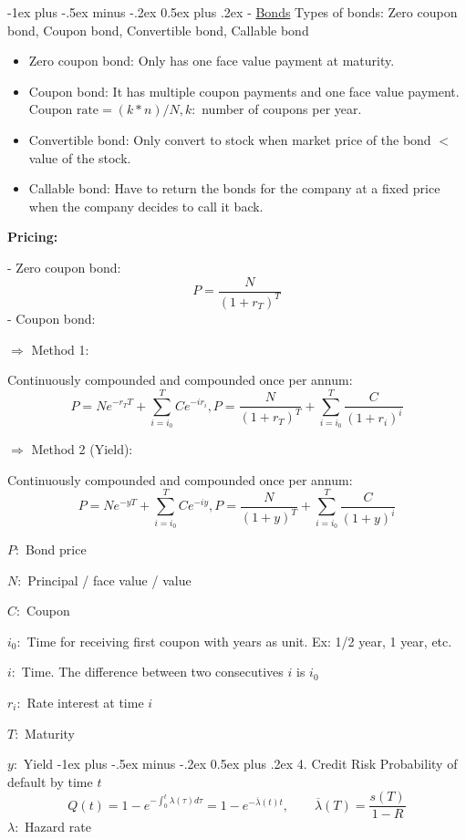 \documentclass[10pt,landscape]{article}
\makeatletter
\renewcommand{\section}{\@startsection{section}{1}{0mm}%
                                {-1ex plus -.5ex minus -.2ex}%
                                {0.5ex plus .2ex}%
                                {\normalfont\large\bfseries}}
\renewcommand{\subsection}{\@startsection{subsection}{2}{0mm}%
                                {-1ex plus -.5ex minus -.2ex}%
                                {0.5ex plus .2ex}%
                                {\normalfont\normalsize\bfseries}}
\makeatother
\begin{document}
\begin{multicols}{3}
    \subsection{- \underline{Bonds}}
    Types of bonds:
    Zero coupon bond, Coupon bond, Convertible bond, Callable bond
    \begin{itemize}[label={--},leftmargin=4mm]
        \vspace{-1mm}
        \itemsep -.4mm
        \item Zero coupon bond: Only has one face value payment at maturity.
        \item Coupon bond: It has multiple coupon payments and one face value payment.
            $\text{Coupon rate} = (k*n)/N, k:$ number of coupons per year.
        \item Convertible bond: Only convert to stock when market price of the bond $<$ value of the stock.
        \item Callable bond: Have to return the bonds for the company at a fixed price when the company decides to call it back.
    \end{itemize}

    \textbf{Pricing:}
    
    - Zero coupon bond:
    $$P=\frac{N}{(1+r_T)^T}$$
    - Coupon bond:
    
    
    $\Rightarrow$ Method 1:
    
    Continuously compounded and compounded once per annum:
    $$P=Ne^{-r_TT} + \sum_{i=i_0}^T Ce^{-ir_i}, P=\frac{N}{(1+r_T)^T} + \sum_{i=i_0}^T \frac{C}{(1+r_i)^i}$$

    $\Rightarrow$ Method 2 (Yield):
    
    Continuously compounded and compounded once per annum:
    $$P=Ne^{-yT} + \sum_{i=i_0}^T Ce^{-iy}, P=\frac{N}{(1+y)^T} + \sum_{i=i_0}^T \frac{C}{(1+y)^{i}}$$

    $P:$ Bond price
    
    $N:$ Principal / face value / value

    $C:$ Coupon

    $i_0:$ Time for receiving first coupon with years as unit. Ex: 1/2 year, 1 year, etc. 
    
    $i:$ Time. The difference between two consecutives $i$ is $i_0$
    
    $r_i:$ Rate interest at time $i$

    $T:$ Maturity

    $y:$ Yield
    \section{4. Credit Risk}
    Probability of default by time $t$
    $$Q(t) = 1 - e^{-\int_{0}^{t}\lambda(\tau)d \tau} = 1 - e^{-\overline{\lambda}(t)t}, \qquad \overline{\lambda}(T) = \frac{s(T)}{1-R}$$
    $\lambda:$ Hazard rate


\end{multicols}
\end{document}
